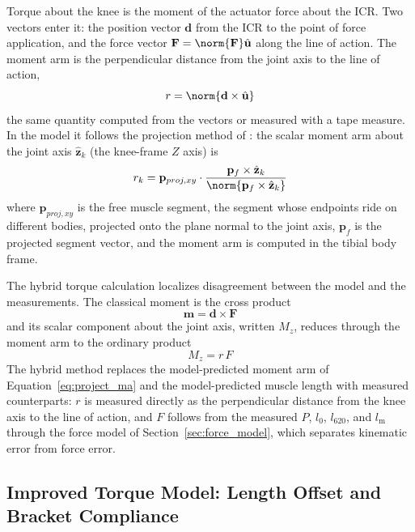 Torque about the knee is the moment of the actuator force about the ICR. Two vectors enter it: the position vector $\mathbf{d}$ from the ICR to the point of force application, and the force vector $\mathbf{F} = \norm{\mathbf{F}}\hat{\mathbf{u}}$ along the line of action. The moment arm is the perpendicular distance from the joint axis to the line of action,
\begin{equation}
    r = \norm{\mathbf{d} \times \hat{\mathbf{u}}}
    \label{eq:momentarm_def}
\end{equation}
the same quantity computed from the vectors or measured with a tape measure. In the model it follows the projection method of \citet{young_analyzing_2019}: the scalar moment arm about the joint axis $\hat{\mathbf{z}}_{k}$ (the knee-frame $Z$ axis) is
\begin{equation}
    r_{k} = \mathbf{p}_{proj,xy} \cdot \frac{\mathbf{p}_{f} \times \hat{\mathbf{z}}_{k}} {\norm{\mathbf{p}_{f} \times \hat{\mathbf{z}}_{k}}} \label{eq:project_ma}
\end{equation}
where $\mathbf{p}_{proj,xy}$ is the free muscle segment, the segment whose endpoints ride on different bodies, projected onto the plane normal to the joint axis, $\mathbf{p}_{f}$ is the projected segment vector, and the moment arm is computed in the tibial body frame.

The hybrid torque calculation localizes disagreement between the model and the measurements. The classical moment is the cross product
\begin{equation}
    \mathbf{m} = \mathbf{d} \times \mathbf{F} \label{eq:M_vec}
\end{equation}
and its scalar component about the joint axis, written $M_{z}$, reduces through the moment arm to the ordinary product
\begin{equation}
    M_{z} = r\,F \label{eq:M_scalar}
\end{equation}
The hybrid method replaces the model-predicted moment arm of Equation~\eqref{eq:project_ma} and the model-predicted muscle length with measured counterparts: $r$ is measured directly as the perpendicular distance from the knee axis to the line of action, and $F$ follows from the measured $P$, $l_{0}$, $l_{620}$, and $l_\text{m}$ through the force model of Section~\ref{sec:force_model}, which separates kinematic error from force error.

\subsection{Improved Torque Model: Length Offset and Bracket Compliance}\label{sec:improved_model}

